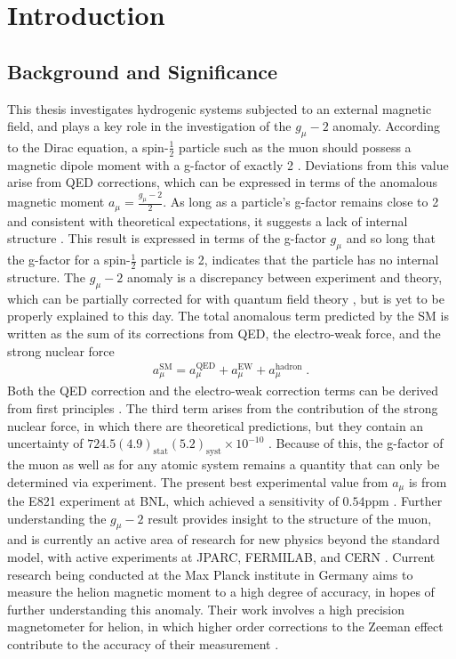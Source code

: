 \chapter{Introduction}
    \section{Background and Significance}
        This thesis investigates hydrogenic systems subjected to an external magnetic field, and plays a key role in the investigation of the $g_\mu - 2$ anomaly. According to the Dirac equation, a spin-$\frac{1}{2}$ particle such as the muon should possess a magnetic dipole moment with a g-factor of exactly 2 \cite{The_quantum_theory_of_the_electron_1928}. Deviations from this value arise from QED corrections, which can be expressed in terms of the anomalous magnetic moment $a_\mu = \frac{g_\mu-2}{2}$. As long as a particle's g-factor remains close to 2 and consistent with theoretical expectations, it suggests a lack of internal structure \cite{Iinuma_J-PARC}. This result is expressed in terms of the g-factor $g_\mu$ and so long that the g-factor for a spin-$\frac{1}{2}$ particle is 2, indicates that the particle has no internal structure. The $g_\mu - 2$ anomaly is a discrepancy between experiment and theory, which can be partially corrected for with quantum field theory \cite{Iinuma_J-PARC}, but is yet to be properly explained to this day. The total anomalous term predicted by the SM is written as the sum of its corrections from QED, the electro-weak force, and the strong nuclear force
        \begin{align}
            a_\mu^{\text{SM}} = a_\mu^{\text{QED}} + a_\mu^{\text{EW}} + a_\mu^{\text{hadron}}\;.\label{eq:g-2_Anomaly}
        \end{align}
        Both the QED correction and the electro-weak correction terms can be derived from first principles \cite{Degrassi_Giudice_1998}. The third term arises from the contribution of the strong nuclear force, in which there are theoretical predictions, but they contain an uncertainty of $724.5(4.9)_{\text{stat}}(5.2)_{\text{syst}} \times 10^{-10}$ \cite{Djukanovic_Hippel_Kuberski_Meyer_Miller_Ottnad_Parrino_Risch_Wittig_2025}. Because of this, the g-factor of the muon as well as for any atomic system remains a quantity that can only be determined via experiment. The present best experimental value from $a_\mu$ is from the E821 experiment at BNL, which achieved a sensitivity of $0.54$ppm \cite{Iinuma_J-PARC}. Further understanding the $g_\mu - 2$ result provides insight to the structure of the muon, and is currently an active area of research for new physics beyond the standard model, with active experiments at JPARC, FERMILAB, and CERN \cite{Iinuma_J-PARC, Kim_2024}. Current research being conducted at the Max Planck institute in Germany aims to measure the helion magnetic moment to a high degree of accuracy, in hopes of further understanding this anomaly. Their work involves a high precision magnetometer for helion, in which higher order corrections to the Zeeman effect contribute to the accuracy of their measurement \cite{Schneider_Sikora_Dickopf_Müller_Oreshkina_Rischka_Valuev_Ulmer_Walz_Harman_et_al._2022}.
